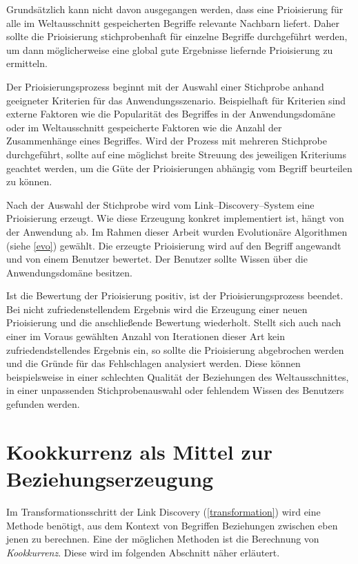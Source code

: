 Grundsätzlich kann nicht davon ausgegangen werden, dass eine Prioisierung für alle im Weltausschnitt gespeicherten Begriffe relevante Nachbarn liefert. Daher sollte die Prioisierung stichprobenhaft für einzelne Begriffe durchgeführt werden, um dann möglicherweise eine global gute Ergebnisse liefernde Prioisierung zu ermitteln.

Der Prioisierungsprozess beginnt mit der Auswahl einer Stichprobe anhand geeigneter Kriterien für das Anwendungsszenario. Beispielhaft für Kriterien sind externe Faktoren wie die Popularität des Begriffes in der Anwendungsdomäne oder im Weltausschnitt gespeicherte Faktoren wie die Anzahl der Zusammenhänge eines Begriffes. Wird der Prozess mit mehreren Stichprobe durchgeführt, sollte auf eine möglichst breite Streuung des jeweiligen Kriteriums geachtet werden, um die Güte der Prioisierungen abhängig vom Begriff beurteilen zu können.

Nach der Auswahl der Stichprobe wird vom Link--Discovery--System eine Prioisierung erzeugt. Wie diese Erzeugung konkret implementiert ist, hängt von der Anwendung ab. Im Rahmen dieser Arbeit wurden Evolutionäre Algorithmen (siehe \cref{evo}) gewählt. Die erzeugte Prioisierung wird auf den Begriff angewandt und von einem Benutzer bewertet. Der Benutzer sollte Wissen über die Anwendungsdomäne besitzen.

Ist die Bewertung der Prioisierung positiv, ist der Prioisierungsprozess beendet. Bei nicht zufriedenstellendem Ergebnis wird die Erzeugung einer neuen Prioisierung und die anschließende Bewertung wiederholt. Stellt sich auch nach einer im Voraus gewählten Anzahl von Iterationen dieser Art kein zufriedendstellendes Ergebnis ein, so sollte die Prioisierung abgebrochen werden und die Gründe für das Fehlschlagen analysiert werden. Diese können beispielsweise in einer schlechten Qualität der Beziehungen des Weltausschnittes, in einer unpassenden Stichprobenauswahl oder fehlendem Wissen des Benutzers gefunden werden.

\section{Kookkurrenz als Mittel zur Beziehungserzeugung}
\label{co-occurence}

Im Transformationsschritt der Link Discovery (\cref{transformation}) wird eine Methode benötigt, aus dem Kontext von Begriffen Beziehungen zwischen eben jenen zu berechnen. Eine der möglichen Methoden ist die Berechnung von \emph{Kookkurrenz}. Diese wird im folgenden Abschnitt näher erläutert.

